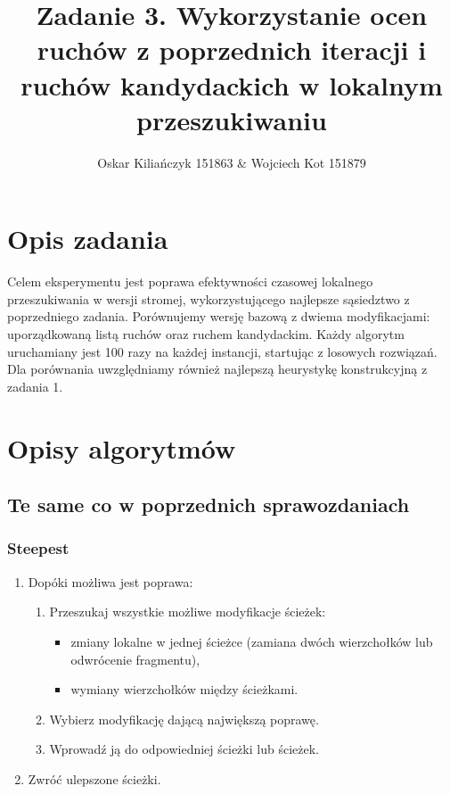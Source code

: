 \documentclass[11pt]{article}
\title{Zadanie 3. Wykorzystanie ocen ruchów z poprzednich iteracji i ruchów
kandydackich w lokalnym przeszukiwaniu}
\author{Oskar Kiliańczyk 151863 \& Wojciech Kot 151879}
\date{}
\begin{document}
\maketitle
\newpage

\section{Opis zadania}\label{sec:opis-zadania}

Celem eksperymentu jest poprawa efektywności czasowej lokalnego przeszukiwania w wersji stromej, wykorzystującego najlepsze sąsiedztwo z poprzedniego zadania.
Porównujemy wersję bazową z dwiema modyfikacjami: uporządkowaną listą ruchów oraz ruchem kandydackim.
Każdy algorytm uruchamiany jest 100 razy na każdej instancji, startując z losowych rozwiązań.
Dla porównania uwzględniamy również najlepszą heurystykę konstrukcyjną z zadania 1.

\section{Opisy algorytmów}\label{sec:opisy-alg}

\subsection{Te same co w poprzednich sprawozdaniach}\label{subsec:te-same-co-w-poprzednich-sprawozdaniach}

\subsubsection{Steepest}\label{subsec:steepest}

\begin{enumerate}
  \item Dopóki możliwa jest poprawa:
  \begin{enumerate}
    \item Przeszukaj wszystkie możliwe modyfikacje ścieżek:
    \begin{itemize}
      \item zmiany lokalne w jednej ścieżce (zamiana dwóch wierzchołków lub odwrócenie fragmentu),
      \item wymiany wierzchołków między ścieżkami.
    \end{itemize}
    \item Wybierz modyfikację dającą największą poprawę.
    \item Wprowadź ją do odpowiedniej ścieżki lub ścieżek.
  \end{enumerate}
  \item Zwróć ulepszone ścieżki.
\end{enumerate}
\end{document}
